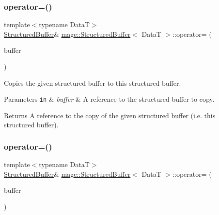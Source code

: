\subsubsection{\texorpdfstring{operator=()}{operator=()}\hspace{0.1cm}{\footnotesize\ttfamily [1/2]}}
{\footnotesize\ttfamily template$<$typename DataT$>$ \\
\hyperlink{structmage_1_1_structured_buffer}{Structured\+Buffer}\& \hyperlink{structmage_1_1_structured_buffer}{mage\+::\+Structured\+Buffer}$<$ DataT $>$\+::operator= (\begin{DoxyParamCaption}\item[{const \hyperlink{structmage_1_1_structured_buffer}{Structured\+Buffer}$<$ DataT $>$ \&}]{buffer }\end{DoxyParamCaption})\hspace{0.3cm}{\ttfamily [delete]}}

Copies the given structured buffer to this structured buffer.


\begin{DoxyParams}[1]{Parameters}
\mbox{\tt in}  & {\em buffer} & A reference to the structured buffer to copy. \\
\hline
\end{DoxyParams}
\begin{DoxyReturn}{Returns}
A reference to the copy of the given structured buffer (i.\+e. this structured buffer). 
\end{DoxyReturn}
\hypertarget{structmage_1_1_structured_buffer_a2647510e153d15b89f860e2a5c68e231}{}\label{structmage_1_1_structured_buffer_a2647510e153d15b89f860e2a5c68e231} 
\subsubsection{\texorpdfstring{operator=()}{operator=()}\hspace{0.1cm}{\footnotesize\ttfamily [2/2]}}
{\footnotesize\ttfamily template$<$typename DataT$>$ \\
\hyperlink{structmage_1_1_structured_buffer}{Structured\+Buffer}\& \hyperlink{structmage_1_1_structured_buffer}{mage\+::\+Structured\+Buffer}$<$ DataT $>$\+::operator= (\begin{DoxyParamCaption}\item[{\hyperlink{structmage_1_1_structured_buffer}{Structured\+Buffer}$<$ DataT $>$ \&\&}]{buffer }\end{DoxyParamCaption})\hspace{0.3cm}{\ttfamily [delete]}}

